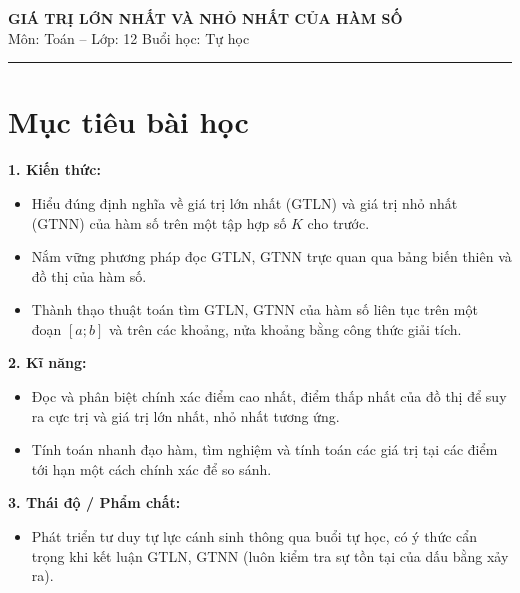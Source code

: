 \documentclass[12pt]{article}
\begin{document}
	
	\begin{center}
		{\LARGE \textbf{GIÁ TRỊ LỚN NHẤT VÀ NHỎ NHẤT CỦA HÀM SỐ}}\\[6pt]
		{\large Môn: Toán -- Lớp: 12 \quad Buổi học: Tự học}
	\end{center}
	\vspace{4mm}
	\hrule
	\vspace{4mm}
	
	\section*{Mục tiêu bài học}
	
	\textbf{1. Kiến thức:}
	\begin{itemize}
		\item Hiểu đúng định nghĩa về giá trị lớn nhất (GTLN) và giá trị nhỏ nhất (GTNN) của hàm số trên một tập hợp số $K$ cho trước.
		\item Nắm vững phương pháp đọc GTLN, GTNN trực quan qua bảng biến thiên và đồ thị của hàm số.
		\item Thành thạo thuật toán tìm GTLN, GTNN của hàm số liên tục trên một đoạn $[a; b]$ và trên các khoảng, nửa khoảng bằng công thức giải tích.
	\end{itemize}
	
	\textbf{2. Kĩ năng:}
	\begin{itemize}
		\item Đọc và phân biệt chính xác điểm cao nhất, điểm thấp nhất của đồ thị để suy ra cực trị và giá trị lớn nhất, nhỏ nhất tương ứng.
		\item Tính toán nhanh đạo hàm, tìm nghiệm và tính toán các giá trị tại các điểm tới hạn một cách chính xác để so sánh.
	\end{itemize}
	
	\textbf{3. Thái độ / Phẩm chất:}
	\begin{itemize}
		\item Phát triển tư duy tự lực cánh sinh thông qua buổi tự học, có ý thức cẩn trọng khi kết luận GTLN, GTNN (luôn kiểm tra sự tồn tại của dấu bằng xảy ra).
	\end{itemize}
	
	\newpage
	
	\setcounter{tocdepth}{2}
	\tableofcontents
	\newpage
	
\end{document}
